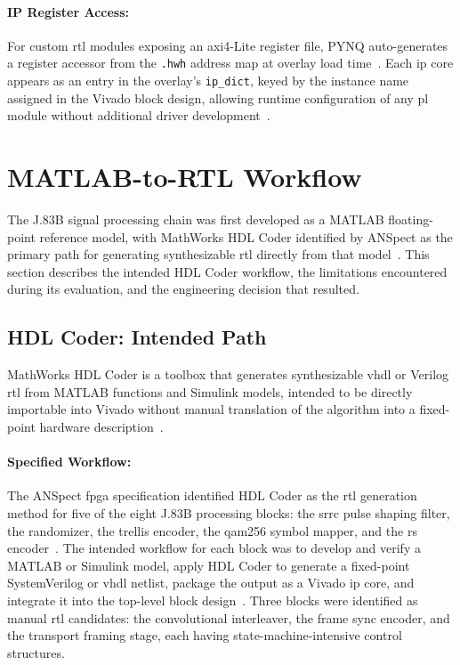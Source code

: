 \paragraph{IP Register Access:}
For custom \ac{rtl} modules exposing an \ac{axi}4-Lite register file,
PYNQ auto-generates a register accessor from the \texttt{.hwh} address
map at overlay load time~\cite{PYNQ_DOC}.
Each \ac{ip} core appears as an entry in the overlay's
\texttt{ip\_dict}, keyed by the instance name assigned in the Vivado
block design, allowing runtime configuration of any \ac{pl} module
without additional driver development~\cite{PYNQ_DOC}.




\section{MATLAB-to-RTL Workflow}
\label{sec:matlab_rtl}

The J.83B signal processing chain was first developed as a MATLAB
floating-point reference model, with MathWorks HDL Coder identified
by ANSpect as the primary path for generating synthesizable \ac{rtl}
directly from that model~\cite{HDLCoder}.
This section describes the intended HDL Coder workflow, the
limitations encountered during its evaluation, and the engineering
decision that resulted.


\subsection{HDL Coder: Intended Path}
\label{subsec:hdlcoder_intended}

MathWorks HDL Coder is a toolbox that generates synthesizable
\ac{vhdl} or Verilog \ac{rtl} from MATLAB functions and Simulink
models, intended to be directly importable into Vivado without
manual translation of the algorithm into a fixed-point hardware
description~\cite{HDLCoder}.

\paragraph{Specified Workflow:}
The ANSpect \ac{fpga} specification identified HDL Coder as the
\ac{rtl} generation method for five of the eight J.83B processing
blocks: the \ac{srrc} pulse shaping filter, the randomizer, the
trellis encoder, the \ac{qam256} symbol mapper, and the \ac{rs}
encoder~\cite{HDLCoder}.
The intended workflow for each block was to develop and verify a
MATLAB or Simulink model, apply HDL Coder to generate a fixed-point
SystemVerilog or \ac{vhdl} netlist, package the output as a Vivado
\ac{ip} core, and integrate it into the top-level block
design~\cite{HDLCoder}.
Three blocks were identified as manual \ac{rtl} candidates: the
convolutional interleaver, the frame sync encoder, and the transport
framing stage, each having state-machine-intensive control structures.


